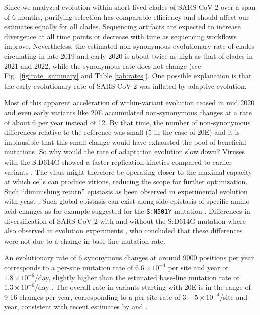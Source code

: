 \documentclass[aps,rmp, twocolumn]{revtex4}
\begin{document}
Since we analyzed evolution within short lived clades of SARS-CoV-2 over a span of 6 months, purifying selection has comparable efficiency and should affect our estimates equally for all clades.
Sequencing artifacts are expected to increase divergence at all time points or decrease with time as sequencing workflows improve.
Nevertheless, the estimated non-synonymous evolutionary rate of clades circulating in late 2019 and early 2020 is about twice as high as that of clades in 2021 and 2022, while the synonymous rate does not change (see Fig.~\ref{fig:rate_summary} and Table \ref{tab:rates}).
One possible explanation is that the early evolutionary rate of SARS-CoV-2 was inflated by adaptive evolution.

Most of this apparent acceleration of within-variant evolution ceased in mid 2020 and even early variants like 20E accumulated non-synonymous changes at a rate of about 6 per year instead of 12.
By that time, the number of non-synonymous differences relative to the reference was small (5 in the case of 20E) and it is implausible that this small change would have exhausted the pool of beneficial mutations.
So why would the rate of adaptation evolution slow down?
Viruses with the S:D614G showed a faster replication kinetics compared to earlier variants \citep{korber_tracking_2020}.
The virus might therefore be operating closer to the maximal capacity at which cells can produce virions, reducing the scope for further optimization.
Such ``diminishing return'' epistasis as been observed in experimental evolution with yeast \citep{kryazhimskiy_global_2014}.
Such global epistasis can exist along side epistasis of specific amino acid changes as for example suggested for the \texttt{S:N501Y} mutation \citep{martin_emergence_2021}.
Differences in diversification of SARS-CoV-2 with and without the S:D614G mutation where also observed in evolution experiments \citep{amicone_mutation_2022}, who concluded that these differences were not due to a change in base line mutation rate.

An evolutionary rate of 6 synonymous changes at around 9000 positions per year corresponds to a per-site mutation rate of $6.6\times 10^{-4}$ per site and year or $1.8\times 10^{-6}$/day, slightly higher than the estimated base-line mutation rate of $1.3\times 10^{-6}$/day \citep{amicone_mutation_2022}.
The overall rate in variants starting with 20E is in the range of 9-16 changes per year, corresponding to a per site rate of $3 - 5\times 10^{-4}$/site and year, consistent with recent estimates by \citet{hill_origins_2022} and \citet{tay_emergence_2022}.
\end{document}

